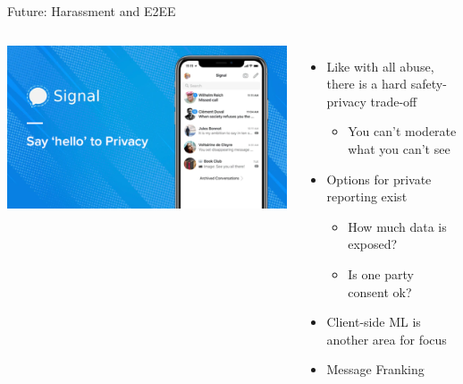 \documentclass[nobackground,dvipsnames,table,aspectratio=169]{beamer}
\begin{document}
\begin{frame}{Future: Harassment and E2EE}
    \begin{columns}
            \includegraphics[width=\textwidth]{signal}
            \begin{itemize}
                \item Like with all abuse, there is a hard safety-privacy trade-off
                \begin{itemize}
                    \item You can’t moderate what you can’t see
                \end{itemize}
                \item Options for private reporting exist
                \begin{itemize}
                    \item How much data is exposed?
                    \item Is one party consent ok?
                \end{itemize}
                \item Client-side ML is another area for focus
                \item Message Franking
            \end{itemize}
    \end{columns}
\end{frame}
\end{document}
